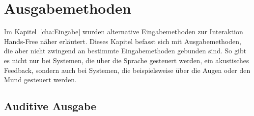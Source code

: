 \chapter{Ausgabemethoden}
\label{cha:Ausgabe}

Im Kapitel~\ref{cha:Eingabe} wurden alternative Eingabemethoden zur Interaktion Hands-Free näher erläutert. Dieses Kapitel befasst sich mit Ausgabemethoden, die aber nicht zwingend an bestimmte Eingabemethoden gebunden sind. So gibt es nicht nur bei Systemen, die über die Sprache gesteuert werden, ein akustisches Feedback, sondern auch bei Systemen, die beispielsweise über die Augen oder den Mund gesteuert werden. 


\section{Auditive Ausgabe}

